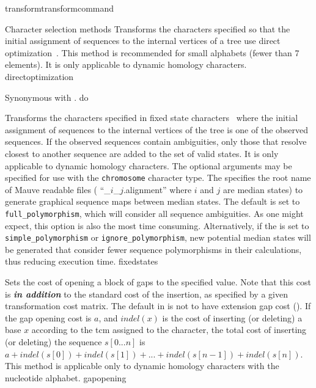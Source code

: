 \begin{command}{transform}{transformcommand}
\begin{arguments}
\begin{argumentgroup}{Character selection methods}
              {Transforms the characters specified so that the initial assignment of sequences to 
              the internal vertices of a tree use direct
              optimization~\cite{wheeler1996}. This method is recommended for small
              alphabets (fewer than 7 elements). It is only applicable to dynamic homology
              characters.}
              {directoptimization}

                {Synonymous with .}
                {do}
          
                {Transforms the characters specified in fixed state characters~\cite{wheeler1999a}
                where the initial assignment of sequences to the internal vertices of
                the tree is one of the observed sequences. If the observed sequences
                contain ambiguities, only those that resolve closest to another
                sequence are added to the set of valid states. It is only
                applicable to dynamic homology characters.  The optional arguments 
                may be specified for use with the \texttt{chromosome} character type.  
                The \poystring specifies the root name of Mauve \cite{darlingetal2004} 
                readable files ( ``\poystring\_$i$\_$j$.alignment'' where $i$ and $j$ are 
                median states) to generate graphical sequence maps between median states.  
                The default \poylident is set to \texttt{full\_polymorphism}, which will 
                consider all sequence ambiguities.  As one might expect, this option is also the most 
                time consuming. Alternatively, if the \poylident is set to \texttt{simple\_polymorphism} 
                or \texttt{ignore\_polymorphism}, new potential median states will be generated that consider fewer 
                sequence polymorphisms in their calculations, thus reducing execution time.}
                {fixedstates}

                {Sets the cost of opening a block of gaps to the specified value. Note that
                this cost is {\bf \emph{in addition}} to the standard cost of the insertion, as
                specified by a given transformation cost matrix.
                The default in \poy is not to have extension
                gap cost (). If the gap
                opening cost is
                $a$, and $indel(x)$ is the cost of inserting (or deleting) a
                base $x$ according to the tcm assigned to the character, the total
                cost of inserting (or deleting) the sequence $s[0...n]$ is $a +
                indel(s[0]) + indel(s[1]) + ... + indel(s[n - 1]) + indel(s[n]).$
                This method is applicable only to dynamic homology characters with
                the nucleotide alphabet.} 
                {gapopening}


\end{argumentgroup}
\end{arguments}
\end{command}
